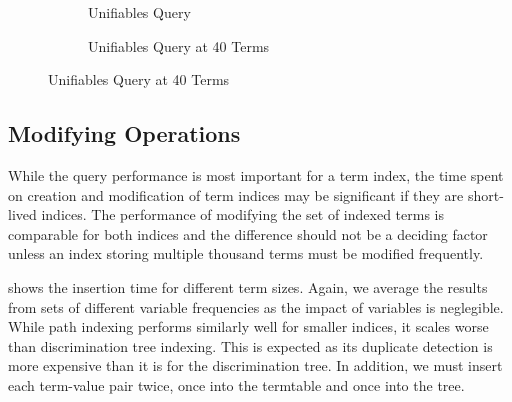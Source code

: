 \begin{figure}[h]
  \begin{subfigure}{0.45\textwidth}
\begin{adjustbox}{width=1\textwidth}
\end{adjustbox}
\caption{Unifiables Query}
\label{unif}
\end{subfigure}
\begin{subfigure}{0.1\textwidth}
\end{subfigure}
\begin{subfigure}{0.45\textwidth}
\begin{adjustbox}{width=1\textwidth}
\end{adjustbox}
\caption{Unifiables Query at 40 Terms}
\label{unifvar}
\end{subfigure}
\end{figure}

\subsection{Modifying Operations}
While the query performance is most important for a term index, the time spent on creation and modification of term indices may be significant if they are short-lived indices. The performance of modifying the set of indexed terms is comparable for both indices and the difference should not be a deciding factor unless an index storing multiple thousand terms must be modified frequently.

 shows the insertion time for different term sizes. Again, we average the results from sets of different variable frequencies as the impact of variables is neglegible.
While path indexing performs similarly well for smaller indices, it scales worse than discrimination tree indexing. This is expected as its duplicate detection is more expensive than it is for the discrimination tree. In addition, we must insert each term-value pair twice, once into the termtable and once into the tree.

